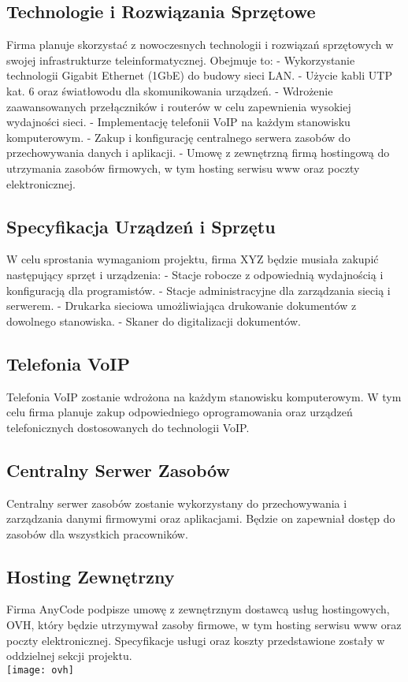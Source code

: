\subsection{Technologie i Rozwiązania Sprzętowe}

Firma planuje skorzystać z nowoczesnych technologii i rozwiązań sprzętowych w swojej infrastrukturze teleinformatycznej. Obejmuje to:
- Wykorzystanie technologii Gigabit Ethernet (1GbE) do budowy sieci LAN.
- Użycie kabli UTP kat. 6 oraz światłowodu dla skomunikowania urządzeń.
- Wdrożenie zaawansowanych przełączników i routerów w celu zapewnienia wysokiej wydajności sieci.
- Implementację telefonii VoIP na każdym stanowisku komputerowym.
- Zakup i konfigurację centralnego serwera zasobów do przechowywania danych i aplikacji.
- Umowę z zewnętrzną firmą hostingową do utrzymania zasobów firmowych, w tym hosting serwisu www oraz poczty elektronicznej.

\subsection{Specyfikacja Urządzeń i Sprzętu}

W celu sprostania wymaganiom projektu, firma XYZ będzie musiała zakupić następujący sprzęt i urządzenia:
- Stacje robocze z odpowiednią wydajnością i konfiguracją dla programistów.
- Stacje administracyjne dla zarządzania siecią i serwerem.
- Drukarka sieciowa umożliwiająca drukowanie dokumentów z dowolnego stanowiska.
- Skaner do digitalizacji dokumentów.

\subsection{Telefonia VoIP}

Telefonia VoIP zostanie wdrożona na każdym stanowisku komputerowym. W tym celu firma planuje zakup odpowiedniego oprogramowania oraz urządzeń telefonicznych dostosowanych do technologii VoIP.

\subsection{Centralny Serwer Zasobów}

Centralny serwer zasobów zostanie wykorzystany do przechowywania i zarządzania danymi firmowymi oraz aplikacjami. Będzie on zapewniał dostęp do zasobów dla wszystkich pracowników.

\subsection{Hosting Zewnętrzny}

Firma AnyCode podpisze umowę z zewnętrznym dostawcą usług hostingowych, OVH, który będzie utrzymywał zasoby firmowe, w tym hosting serwisu www oraz poczty elektronicznej. Specyfikacje usługi oraz koszty przedstawione zostały w oddzielnej sekcji projektu.
\\
\texttt{[image: ovh]} \\
